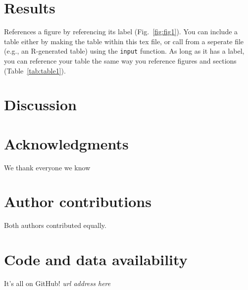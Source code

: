 \documentclass[11pt]{article}
\begin{document}

\section{Results}
References a figure by referencing its label (Fig.~\ref{fig:fig1}).
You can include a table either by making the table within this tex file, or call from a seperate file (e.g., an R-generated table) using the \texttt{input} function.
As long as it has a label, you can reference your table the same way you reference figures and sections (Table~\ref{tab:table1}).








\section{Discussion}

\lipsum[75]





\section{Acknowledgments}
We thank everyone we know

\section{Author contributions}
Both authors contributed equally.

\section{Code and data availability}
It's all on GitHub! \emph{url address here}


\pagebreak
\end{document}
